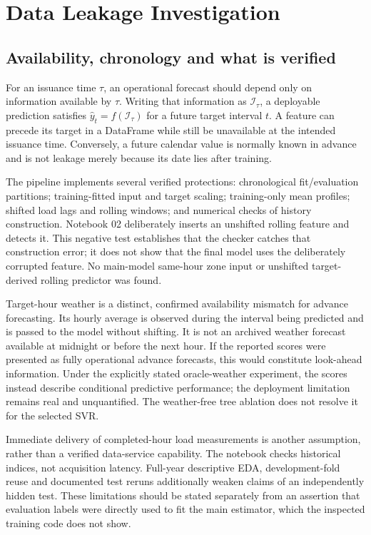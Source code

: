 \section{Data Leakage Investigation}\label{sec:leakage}
\subsection{Availability, chronology and what is verified}
For an issuance time $\tau$, an operational forecast should depend only on information available by $\tau$. Writing that information as $\mathcal I_\tau$, a deployable prediction satisfies $\widehat y_t=f(\mathcal I_\tau)$ for a future target interval $t$. A feature can precede its target in a DataFrame while still be unavailable at the intended issuance time. Conversely, a future calendar value is normally known in advance and is not leakage merely because its date lies after training.

The pipeline implements several verified protections: chronological fit/evaluation partitions; training-fitted input and target scaling; training-only mean profiles; shifted load lags and rolling windows; and numerical checks of history construction. Notebook 02 deliberately inserts an unshifted rolling feature and detects it. This negative test establishes that the checker catches that construction error; it does not show that the final model uses the deliberately corrupted feature. No main-model same-hour zone input or unshifted target-derived rolling predictor was found.

Target-hour weather is a distinct, confirmed availability mismatch for advance forecasting. Its hourly average is observed during the interval being predicted and is passed to the model without shifting. It is not an archived weather forecast available at midnight or before the next hour. If the reported scores were presented as fully operational advance forecasts, this would constitute look-ahead information. Under the explicitly stated oracle-weather experiment, the scores instead describe conditional predictive performance; the deployment limitation remains real and unquantified. The weather-free tree ablation does not resolve it for the selected SVR.

Immediate delivery of completed-hour load measurements is another assumption, rather than a verified data-service capability. The notebook checks historical indices, not acquisition latency. Full-year descriptive EDA, development-fold reuse and documented test reruns additionally weaken claims of an independently hidden test. These limitations should be stated separately from an assertion that evaluation labels were directly used to fit the main estimator, which the inspected training code does not show.


